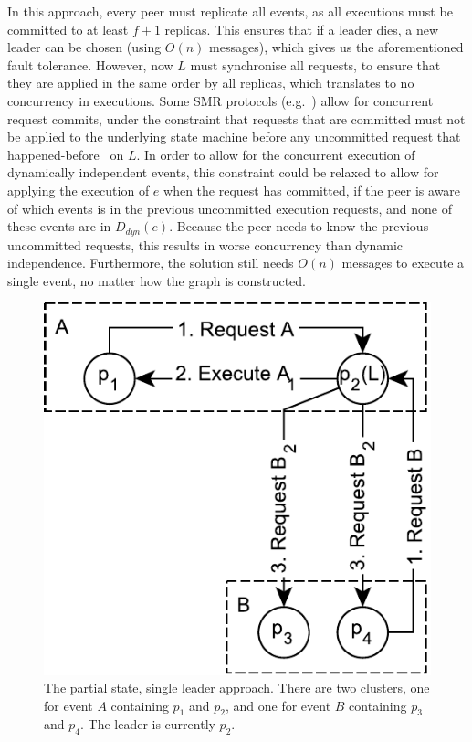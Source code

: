 \documentclass{article}
\begin{document}
	In this approach, every peer must replicate all events, as all executions must be committed to at least $f+1$ replicas.
	This ensures that if a leader dies, a new leader can be chosen (using $O(n)$ messages), which gives us the aforementioned fault tolerance.
	However, now $L$ must synchronise all requests, to ensure that they are applied in the same order by all replicas, which translates to no concurrency in executions.
	Some SMR protocols (e.g.~\cite{castro_practical_1999}) allow for concurrent request commits, under the constraint that requests that are committed must not be applied to the underlying state machine before any uncommitted request that happened-before~\cite{lamport_time_1978} on $L$.
	In order to allow for the concurrent execution of dynamically independent events, this constraint could be relaxed to allow for applying the execution of $e$ when the request has committed, if the peer is aware of which events is in the previous uncommitted execution requests, and none of these events are in $D_{dyn}(e)$.
	Because the peer needs to know the previous uncommitted requests, this results in worse concurrency than dynamic independence.
	Furthermore, the solution still needs $O(n)$ messages to execute a single event, no matter how the graph is constructed.

    \FloatBarrier
    \begin{figure}[ht!]
        \center
        \includegraphics[scale=0.7]{figures/dcr-graphs/partial-state-single-leader-approach.pdf}
        \caption{The partial state, single leader approach.
        There are two clusters, one for event $A$ containing $p_1$ and $p_2$, and one for event $B$ containing $p_3$ and $p_4$.
        The leader is currently $p_2$.}
        \label{fig:partial-state-single-leader-approach}
    \end{figure}
    \FloatBarrier
\end{document}
